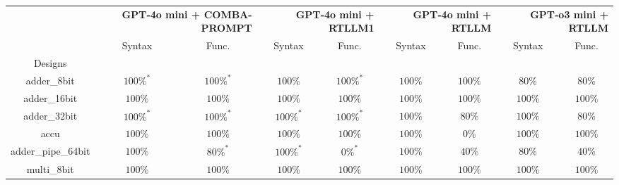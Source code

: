 \begin{tabular}{c|cc|cc|cc|cc}
\toprule
 & \multicolumn{2}{r}{\bfseries GPT‑4o mini + COMBA-PROMPT} & \multicolumn{2}{r}{\bfseries GPT‑4o mini + RTLLM1} & \multicolumn{2}{r}{\bfseries GPT‑4o mini + RTLLM } & \multicolumn{2}{r}{\bfseries GPT‑o3 mini + RTLLM } \\
 & Syntax & Func. & Syntax & Func. & Syntax & Func. & Syntax & Func. \\
Designs &  &  &  &  &  &  &  &  \\
\midrule
adder\_8bit & \color{black} {\cellcolor{lightblue}} $100\%^*$ & \color{black} {\cellcolor{lightgreen}} $100\%^*$ & \color{black} {\cellcolor{lightblue}} $100\%$ & \color{black} {\cellcolor{lightgreen}} $100\%^*$ & \color{black} {\cellcolor{lightblue}} $100\%$ & \color{black} {\cellcolor{lightgreen}} $100\%$ & $80\%$ & $80\%$ \\ \midrule
adder\_16bit & \color{black} {\cellcolor{lightblue}} $100\%$ & \color{black} {\cellcolor{lightgreen}} $100\%$ & \color{black} {\cellcolor{lightblue}} $100\%$ & \color{black} {\cellcolor{lightgreen}} $100\%$ & \color{black} {\cellcolor{lightblue}} $100\%$ & \color{black} {\cellcolor{lightgreen}} $100\%$ & \color{black} {\cellcolor{lightblue}} $100\%$ & \color{black} {\cellcolor{lightgreen}} $100\%$ \\ \midrule
adder\_32bit & \color{black} {\cellcolor{lightblue}} $100\%^*$ & \color{black} {\cellcolor{lightgreen}} $100\%^*$ & \color{black} {\cellcolor{lightblue}} $100\%^*$ & \color{black} {\cellcolor{lightgreen}} $100\%^*$ & \color{black} {\cellcolor{lightblue}} $100\%$ & $80\%$ & \color{black} {\cellcolor{lightblue}} $100\%$ & $80\%$ \\ \midrule
accu & \color{black} {\cellcolor{lightblue}} $100\%$ & \color{black} {\cellcolor{lightgreen}} $100\%$ & \color{black} {\cellcolor{lightblue}} $100\%$ & \color{black} {\cellcolor{lightgreen}} $100\%$ & \color{black} {\cellcolor{lightblue}} $100\%$ & $0\%$ & \color{black} {\cellcolor{lightblue}} $100\%$ & \color{black} {\cellcolor{lightgreen}} $100\%$ \\ \midrule
adder\_pipe\_64bit & \color{black} {\cellcolor{lightblue}} $100\%$ & \color{black} {\cellcolor{lightgreen}} $80\%^*$ & \color{black} {\cellcolor{lightblue}} $100\%^*$ & $0\%^*$ & \color{black} {\cellcolor{lightblue}} $100\%$ & $40\%$ & $80\%$ & $40\%$ \\ \midrule
multi\_8bit & \color{black} {\cellcolor{lightblue}} $100\%$ & \color{black} {\cellcolor{lightgreen}} $100\%$ & \color{black} {\cellcolor{lightblue}} $100\%$ & \color{black} {\cellcolor{lightgreen}} $100\%$ & \color{black} {\cellcolor{lightblue}} $100\%$ & \color{black} {\cellcolor{lightgreen}} $100\%$ & \color{black} {\cellcolor{lightblue}} $100\%$ & \color{black} {\cellcolor{lightgreen}} $100\%$ \\ \midrule

\end{tabular}
